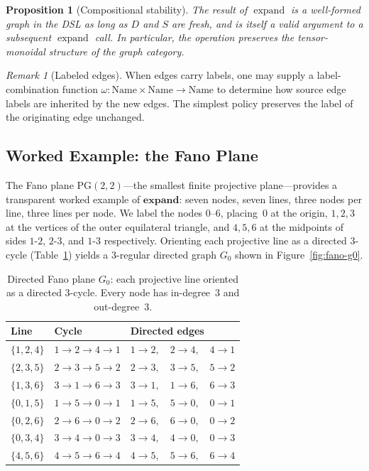 \documentclass[11pt, a4paper]{article}
\theoremstyle{definition}
\theoremstyle{plain}
\newtheorem{proposition}{Proposition}[section]
\theoremstyle{remark}
\newtheorem{remark}{Remark}[section]
\newcommand{\expand}{\operatorname{expand}}
\begin{document}
\begin{proposition}[Compositional stability]
The result of $\expand$ is a well-formed graph in the DSL as long as $D$ and
$S$ are fresh, and is itself a valid argument to a subsequent $\expand$ call.
In particular, the operation preserves the tensor-monoidal structure of the
graph category.
\end{proposition}

\begin{remark}[Labeled edges]
When edges carry labels, one may supply a label-combination function
$\omega : \mathrm{Name} \times \mathrm{Name} \to \mathrm{Name}$ to determine
how source edge labels are inherited by the new edges.  The simplest policy
preserves the label of the originating edge unchanged.
\end{remark}

\subsection{Worked Example: the Fano Plane}
\label{sec:fano}

The Fano plane $\mathrm{PG}(2,2)$---the smallest finite projective
plane---provides a transparent worked example of $\mathbf{expand}$: seven
nodes, seven lines, three nodes per line, three lines per node.
We label the nodes $0$--$6$, placing~$0$ at the origin, $1,2,3$ at the
vertices of the outer equilateral triangle, and $4,5,6$ at the midpoints of
sides $1$-$2$, $2$-$3$, and $1$-$3$ respectively.  Orienting each projective
line as a directed $3$-cycle (Table~\ref{tab:fano-lines}) yields a $3$-regular
directed graph $G_0$ shown in Figure~\ref{fig:fano-g0}.

\begin{table}[ht]
\centering\small
\caption{Directed Fano plane $G_0$: each projective line oriented as a
directed $3$-cycle.  Every node has in-degree~$3$ and out-degree~$3$.}
\label{tab:fano-lines}
\setlength{\tabcolsep}{9pt}
\begin{tabular}{@{}lll@{}}
\toprule
Line & Cycle & Directed edges \\
\midrule
$\{1,2,4\}$ & $1\!\to\!2\!\to\!4\!\to\!1$ & $1\to 2,\quad 2\to 4,\quad 4\to 1$ \\
$\{2,3,5\}$ & $2\!\to\!3\!\to\!5\!\to\!2$ & $2\to 3,\quad 3\to 5,\quad 5\to 2$ \\
$\{1,3,6\}$ & $3\!\to\!1\!\to\!6\!\to\!3$ & $3\to 1,\quad 1\to 6,\quad 6\to 3$ \\
$\{0,1,5\}$ & $1\!\to\!5\!\to\!0\!\to\!1$ & $1\to 5,\quad 5\to 0,\quad 0\to 1$ \\
$\{0,2,6\}$ & $2\!\to\!6\!\to\!0\!\to\!2$ & $2\to 6,\quad 6\to 0,\quad 0\to 2$ \\
$\{0,3,4\}$ & $3\!\to\!4\!\to\!0\!\to\!3$ & $3\to 4,\quad 4\to 0,\quad 0\to 3$ \\
$\{4,5,6\}$ & $4\!\to\!5\!\to\!6\!\to\!4$ & $4\to 5,\quad 5\to 6,\quad 6\to 4$ \\
\bottomrule
\end{tabular}
\end{table}
\end{document}
